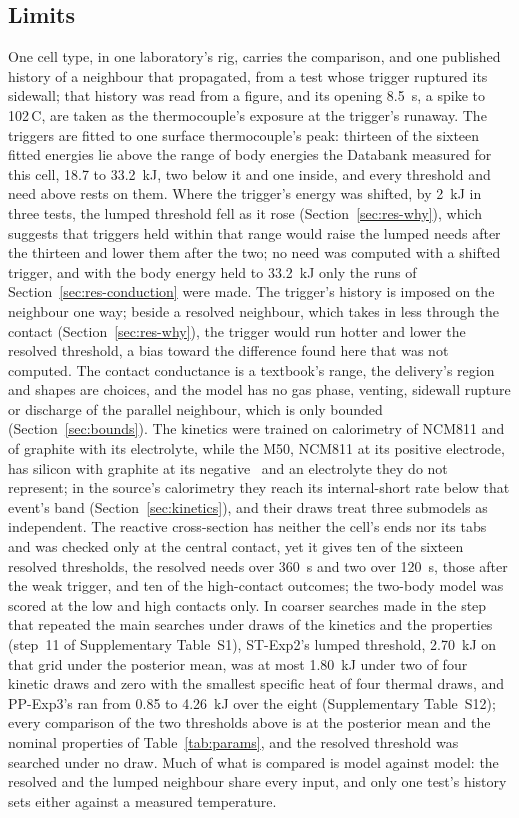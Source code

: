\documentclass[preprint,12pt]{elsarticle}
\newcommand{\degC}{\,\textdegree C}
\begin{document}
\subsection{Limits}
\label{sec:limits}

One cell type, in one laboratory's rig, carries the comparison, and one published history of a neighbour that propagated, from a test whose trigger ruptured its sidewall; that history was read from a figure, and its opening 8.5~s, a spike to 102\degC, are taken as the thermocouple's exposure at the trigger's runaway. The triggers are fitted to one surface thermocouple's peak: thirteen of the sixteen fitted energies lie above the range of body energies the Databank measured for this cell, 18.7 to 33.2~kJ, two below it and one inside, and every threshold and need above rests on them. Where the trigger's energy was shifted, by 2~kJ in three tests, the lumped threshold fell as it rose (Section~\ref{sec:res-why}), which suggests that triggers held within that range would raise the lumped needs after the thirteen and lower them after the two; no need was computed with a shifted trigger, and with the body energy held to 33.2~kJ only the runs of Section~\ref{sec:res-conduction} were made. The trigger's history is imposed on the neighbour one way; beside a resolved neighbour, which takes in less through the contact (Section~\ref{sec:res-why}), the trigger would run hotter and lower the resolved threshold, a bias toward the difference found here that was not computed. The contact conductance is a textbook's range, the delivery's region and shapes are choices, and the model has no gas phase, venting, sidewall rupture or discharge of the parallel neighbour, which is only bounded (Section~\ref{sec:bounds}). The kinetics were trained on calorimetry of NCM811 and of graphite with its electrolyte, while the M50, NCM811 at its positive electrode, has silicon with graphite at its negative~\cite{oregan2022thermal} and an electrolyte they do not represent; in the source's calorimetry they reach its internal-short rate below that event's band (Section~\ref{sec:kinetics}), and their draws treat three submodels as independent. The reactive cross-section has neither the cell's ends nor its tabs and was checked only at the central contact, yet it gives ten of the sixteen resolved thresholds, the resolved needs over 360~s and two over 120~s, those after the weak trigger, and ten of the high-contact outcomes; the two-body model was scored at the low and high contacts only. In coarser searches made in the step that repeated the main searches under draws of the kinetics and the properties (step~11 of Supplementary Table~S1), ST-Exp2's lumped threshold, 2.70~kJ on that grid under the posterior mean, was at most 1.80~kJ under two of four kinetic draws and zero with the smallest specific heat of four thermal draws, and PP-Exp3's ran from 0.85 to 4.26~kJ over the eight (Supplementary Table~S12); every comparison of the two thresholds above is at the posterior mean and the nominal properties of Table~\ref{tab:params}, and the resolved threshold was searched under no draw. Much of what is compared is model against model: the resolved and the lumped neighbour share every input, and only one test's history sets either against a measured temperature.
\end{document}
